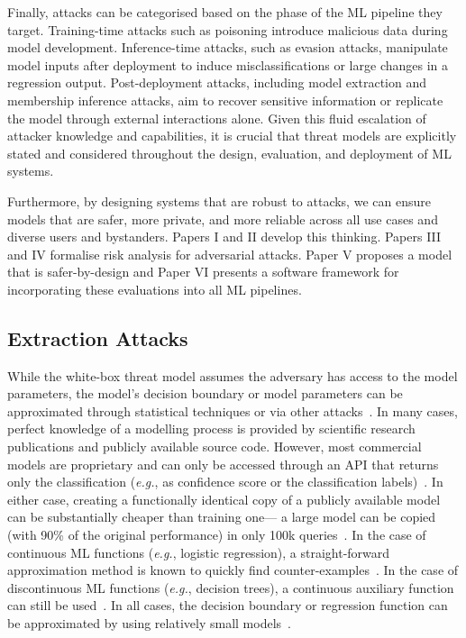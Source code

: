Finally, attacks can be categorised based on the phase of the ML pipeline they target. 
Training-time attacks such as poisoning introduce malicious data during model development. 
Inference-time attacks, such as evasion attacks, manipulate model inputs after deployment to induce misclassifications or large changes in a regression output. 
Post-deployment attacks, including model extraction and membership inference attacks, aim to recover sensitive information or replicate the model through external interactions alone.
Given this fluid escalation of attacker knowledge and capabilities, it is crucial that threat models are explicitly stated and considered throughout the design, evaluation, and deployment of ML systems.

Furthermore, by designing systems that are robust to attacks, we can ensure models that are safer, more private, and more reliable across all use cases and diverse users and bystanders.
Papers I and II develop this thinking. 
Papers III and IV formalise risk analysis for adversarial attacks. 
Paper V proposes a model that is safer-by-design and Paper VI presents a software framework for incorporating these evaluations into all ML pipelines.


\subsection{Extraction Attacks}
\label{subsec:extraction_attacks}
While the white-box threat model assumes the adversary has access to the model parameters, the model's decision boundary or model parameters can be approximated through statistical techniques or via other attacks~\cite{wang2019security,extraction_attack,bentley2020quantifying}. 
In many cases, perfect knowledge of a modelling process is provided by scientific research publications and publicly available source code. 
However, most commercial models are proprietary and can only be accessed through an API that returns only the classification (\textit{e.g.}, as confidence score or the classification labels)~\cite{tramer2016stealing,extraction_attack}. 
In either case, creating a functionally identical copy of a publicly available model can be substantially cheaper than training one--- a large model can be copied (with 90\% of the original performance) in only 100k queries~\cite{leao2025few}. 
In the case of continuous ML functions (\textit{e.g.}, logistic regression), a straight-forward approximation method is known to quickly find counter-examples~\cite{fgm}. 
In the case of discontinuous ML functions (\textit{e.g.}, decision trees), a continuous auxiliary function can still be used~\cite{tramer2016stealing,non_continuous_inversion_attack}. 
In all cases, the decision boundary or regression function can be approximated by using relatively small models~\cite{bekman2021practical,hopskipjump}.

